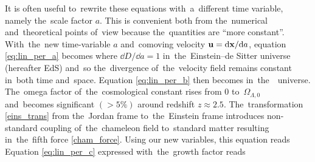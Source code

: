 It is often useful to~rewrite these equations with~a~different time variable, namely the~scale factor $a$. This is convenient both from the~numerical and~theoretical points of~view because the~quantities are ``more constant''. With~the~new time-variable $a$ and~comoving velocity $\mathbf u = \mbox{d} \mathbf x/\mbox{d} a$, equation \eqref{eq:lin_per_a} becomes
where $\dd D/\dd a = 1$ in~the~Einstein--de Sitter universe (hereafter EdS) and~so the~divergence of~the~velocity field remains constant in~both time and~space. Equation \eqref{eq:lin_per_b} then becomes
in~the~\LCDM\ universe. The~omega factor of~the~cosmological constant
rises from $0$ to~$\Omega_{\Lambda,0}$ and~becomes significant $(>5\%)$ around redshift $z\approx2.5$. The~transformation \eqref{eins_trans} from the~Jordan frame to~the~Einstein frame introduces non-standard coupling of~the~chameleon field to~standard matter resulting in~the~fifth force \eqref{cham_force}. Using our new variables, this equation reads
Equation \eqref{eq:lin_per_c} expressed with~the~growth factor reads




% 